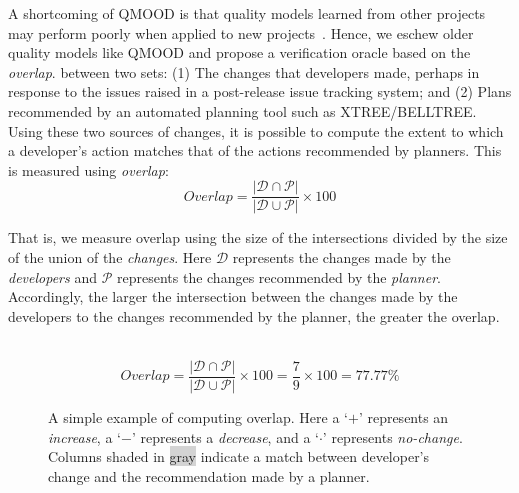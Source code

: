 \documentclass[smallextended]{svjour3}       %
\begin{document}
A shortcoming of QMOOD is that quality models learned from other projects may perform poorly when applied to new projects~\cite{localvsglobal}. Hence,  we eschew older quality models like QMOOD and propose a verification oracle based on the  {\em overlap}.
between two sets: (1) The changes that developers made, perhaps in response to the issues raised in a post-release issue tracking system; and (2) Plans recommended by an automated planning tool such as XTREE/BELLTREE.
Using these two sources of changes, it is possible to compute the extent to which a developer's action matches that of the actions recommended by planners. This is measured using \textit{overlap}:
\begin{equation}
\mathit{Overlap} = \frac{|\mathcal{D} \cap \mathcal{P}|}{|\mathcal{D} \cup \mathcal{P}|}\times 100  
\end{equation}


That is, we measure  overlap using the size of the intersections divided by the size of the union of the \textit{changes}. Here $\mathcal{D}$ represents the changes made by the \textit{developers} and $\mathcal{P}$ represents the changes recommended by the \textit{planner}. Accordingly, the larger the intersection between the changes made by the developers to the changes recommended by the planner, the greater the overlap. 

\begin{figure}[!b]
\centering
{}\\
\[
Overlap = \frac{|\mathcal{D} \cap \mathcal{P}|}{|\mathcal{D} \cup \mathcal{P}|}\times 100 = \frac{7}{9}\times100 = 77.77\%
\]
\caption{A simple example of computing overlap. Here a `$+$' represents an \textit{increase}, a `$-$' represents a \textit{decrease}, and a `$\cdot$' represents \textit{no-change}. Columns shaded in \colorbox{lightgray}{gray} indicate a match between developer's change and the recommendation made by a planner.}
\label{fig:overlap_example}
\end{figure}
\end{document}
